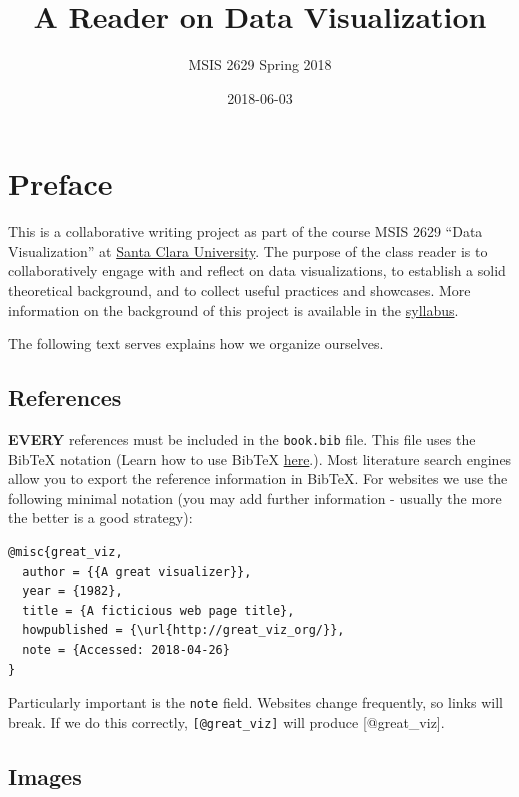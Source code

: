 \documentclass[]{book}
\title{A Reader on Data Visualization}
\author{MSIS 2629 Spring 2018}
\date{2018-06-03}
\theoremstyle{definition}
\theoremstyle{definition}
\theoremstyle{definition}
\theoremstyle{remark}
\begin{document}
\maketitle

{
\setcounter{tocdepth}{1}
\tableofcontents
}
\chapter{Preface}\label{preface}

This is a collaborative writing project as part of the course MSIS 2629
``Data Visualization'' at \href{http://www.scu.edu}{Santa Clara
University}. The purpose of the class reader is to collaboratively
engage with and reflect on data visualizations, to establish a solid
theoretical background, and to collect useful practices and showcases.
More information on the background of this project is available in the
\href{https://mschermann.github.io/msis2629spring2018}{syllabus}.

The following text serves explains how we organize ourselves.

\section{References}\label{references}

\textbf{EVERY} references must be included in the \texttt{book.bib}
file. This file uses the BibTeX notation (Learn how to use BibTeX
\href{http://www.bibtex.org/Using/}{here}.). Most literature search
engines allow you to export the reference information in BibTeX. For
websites we use the following minimal notation (you may add further
information - usually the more the better is a good strategy):

\begin{verbatim}
@misc{great_viz,
  author = {{A great visualizer}},
  year = {1982},
  title = {A ficticious web page title},
  howpublished = {\url{http://great_viz_org/}},
  note = {Accessed: 2018-04-26}
}
\end{verbatim}

Particularly important is the \texttt{note} field. Websites change
frequently, so links will break. If we do this correctly,
\texttt{{[}@great\_viz{]}} will produce {[}@great\_viz{]}.

\section{Images}\label{images}
\end{document}

